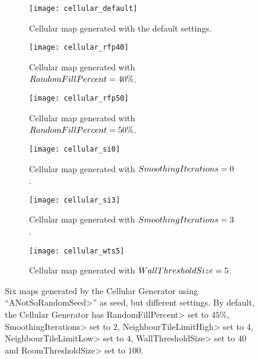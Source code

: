 \begin{figure}[tp]
	\centering
  	\begin{subfigure}[t]{0.315\linewidth}
		\texttt{[image: cellular\_default]}
     		\caption{Cellular map generated with the default settings.}
 	\end{subfigure}
 	\hfill
  	\begin{subfigure}[t]{0.315\linewidth}
    		\texttt{[image: cellular\_rfp40]}
    		\caption{Cellular map generated with $Ran\-dom\-Fill\-Per\-cent = 40\%$.}
  	\end{subfigure}
  	\hfill
	\begin{subfigure}[t]{0.315\linewidth}
    		\texttt{[image: cellular\_rfp50]}
    		\caption{Cellular map generated with $Ran\-dom\-Fill\-Per\-cent = 50\%$.}
  	\end{subfigure}
  	
  	\begin{subfigure}[t]{0.315\linewidth}
		\texttt{[image: cellular\_si0]}
     		\caption{Cellular map generated with $Smooth\-ing\-It\-er\-a\-tions = 0$.}
 	\end{subfigure}
  	\hfill
  	\begin{subfigure}[t]{0.315\linewidth}
    		\texttt{[image: cellular\_si3]}
     		\caption{Cellular map generated with $Smooth\-ing\-It\-er\-a\-tions = 3$.}
  	\end{subfigure}
  	\hfill
  	\begin{subfigure}[t]{0.315\linewidth}
    		\texttt{[image: cellular\_wts5]}
     		\caption{Cellular map generated with $Wall\-Thresh\-old\-Size = 5$.}
  	\end{subfigure}	
	\caption[Six maps generated by the Cellular Generator using ``\<ANotSoRandomSeed>'' as seed, but different settings.]{Six maps generated by the Cellular Generator using ``\<ANotSoRandomSeed>'' as seed, but different settings. By default, the Cellular Generator has \<RandomFillPercent> set to $45\%$, \<SmoothingIterations> set to $2$,  \<NeighbourTileLimitHigh> set to $4$,  \<NeighbourTileLimitLow> set to $4$,  \<WallThresholdSize> set to $40$ and \<RoomThresholdSize> set to $100$.}
	\label{fig:cellulars}
\end{figure}

